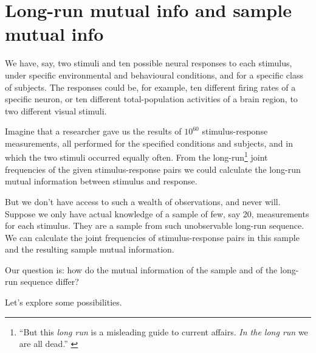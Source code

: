 \documentclass[\ifafour a4paper,12pt,\else a5paper,10pt,\fi%
onecolumn,oneside,article,%
british%
]{memoir}
\theoremstyle{remark}
\theoremstyle{innote}
\renewcommand*{\|}[1][]{\nonscript\,#1\vert\nonscript\;\mathopen{}}
\renewcommand*{\=}{\TextOrMath\texteq\eq}
\newcommand*{\sect}{\S}%
\begin{document}

\section{Long-run mutual info and sample mutual info}
\label{sec:intro}

We have, say, two stimuli and ten possible neural responses to each
stimulus, under specific environmental and behavioural conditions, and for
a specific class of subjects. The responses could be, for example, ten
different firing rates of a specific neuron, or ten different
total-population activities of a brain region, to two different visual
stimuli.

Imagine that a researcher gave us the results of $10^{60}$
stimulus-response measurements, all performed for the specified conditions
and subjects, and in which the two stimuli occurred equally
often. From the long-run\footnote{\enquote{But this \emph{long run} is a
    misleading guide to current affairs. \emph{In the long run} we are all
    dead.} \parencite[\sect~3.I p.~65]{keynes1923_r2013}} joint frequencies
of the given stimulus-response pairs we could calculate the long-run mutual
information between stimulus and response.

But we don't have access to such a wealth of observations, and never will.
Suppose we only have actual knowledge of a sample of few, say 20,
measurements for each stimulus. They are a sample from such
unobservable long-run sequence. We can calculate the joint frequencies of
stimulus-response pairs in this sample and the resulting sample mutual
information.

Our question is: how do the mutual information of the sample and of the
long-run sequence differ?

Let's explore some possibilities.

\clearpage
\end{document}
